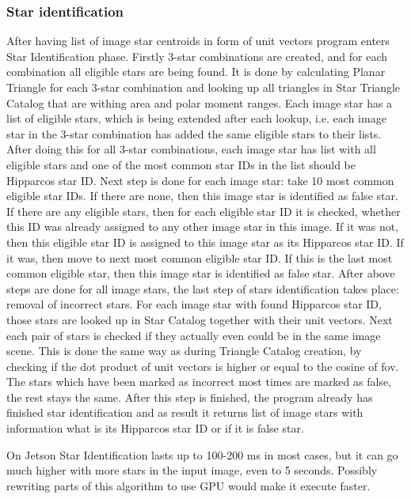 \documentclass[12pt,a4paper,twoside]{article}
\begin{document}
\subsubsection{Star identification}
After having list of image star centroids in form of unit vectors program enters Star Identification phase. Firstly 3-star combinations are created, and for each combination all eligible stars are being found. It is done by calculating Planar Triangle for each 3-star combination and looking up all triangles in Star Triangle Catalog that are withing area and polar moment ranges. Each image star has a list of eligible stars, which is being extended after each lookup, i.e. each image star in the 3-star combination has added the same eligible stars to their lists. After doing this for all 3-star combinations, each image star has list with all eligible stars and one of the most common star IDs in the list should be Hipparcos star ID. Next step is done for each image star: take 10 most common eligible star IDs. If there are none, then this image star is identified as false star. If there are any eligible stars, then for each eligible star ID it is checked, whether this ID was already assigned to any other image star in this image. If it was not, then this eligible star ID is assigned to this image star as its Hipparcos star ID. If it was, then move to next most common eligible star ID. If this is the last most common eligible star, then this image star is identified as false star. After above steps are done for all image stars, the last step of stars identification takes place: removal of incorrect stars. For each image star with found Hipparcos star ID, those stars are looked up in Star Catalog together with their unit vectors. Next each pair of stars is checked if they actually even could be in the same image scene. This is done the same way as during Triangle Catalog creation, by checking if the dot product of unit vectors is higher or equal to the cosine of \gls{fov}. The stars which have been marked as incorrect most times are marked as false, the rest stays the same. After this step is finished, the program already has finished star identification and as result it returns list of image stars with information what is its Hipparcos star ID or if it is false star.

On Jetson Star Identification lasts up to 100-200 ms in most cases, but it can go much higher with more stars in the input image, even to 5 seconds. Possibly rewriting parts of this algorithm to use GPU would make it execute faster.
\end{document}
